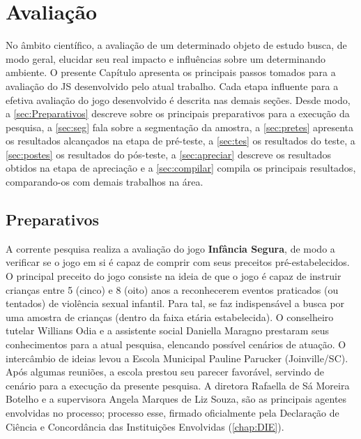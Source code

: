 \chapter{Avaliação}\label{ch:Avaliacao}

No âmbito científico, a avaliação de um determinado objeto de estudo busca, de modo geral, elucidar seu real impacto e influências sobre um determinando ambiente. O presente Capítulo apresenta os principais passos tomados para a avaliação do \acf{JS} desenvolvido pelo atual trabalho. Cada etapa influente para a efetiva avaliação do jogo desenvolvido é descrita nas demais seções. Desde modo, a \autoref{sec:Preparativos} descreve sobre os principais preparativos para a execução da pesquisa, a \autoref{sec:seg} fala sobre a segmentação da amostra, a \autoref{sec:pretes} apresenta os resultados alcançados na etapa de pré-teste, a \autoref{sec:tes} os resultados do teste, a \autoref{sec:postes} os resultados do pós-teste, a \autoref{sec:apreciar} descreve os resultados obtidos na etapa de apreciação e a \autoref{sec:compilar} compila os principais resultados, comparando-os com demais trabalhos na área. 

\section{Preparativos}\label{sec:Preparativos}

A corrente pesquisa realiza a avaliação do jogo \textbf{Infância Segura}, de modo a verificar se o jogo em si é capaz de comprir com seus preceitos pré-estabelecidos. O principal preceito do jogo consiste na ideia de que o jogo é capaz de instruir crianças entre 5 (cinco) e 8 (oito) anos a reconhecerem eventos praticados (ou tentados) de violência sexual infantil. Para tal, se faz indispensável a busca por uma amostra de crianças (dentro da faixa etária estabelecida). O conselheiro tutelar Willians Odia e a assistente social Daniella Maragno prestaram seus conhecimentos para a atual pesquisa, elencando possível cenários de atuação. O intercâmbio de ideias levou a Escola Municipal Pauline Parucker (Joinville/\ac{SC}). Após algumas reuniões, a escola prestou seu parecer favorável, servindo de cenário para a execução da presente pesquisa. A diretora Rafaella de Sá Moreira Botelho e a supervisora Angela Marques de Liz Souza, são as principais agentes envolvidas no processo; processo esse, firmado oficialmente pela Declaração de Ciência e Concordância das Instituições Envolvidas (\autoref{chap:DIE}). 

